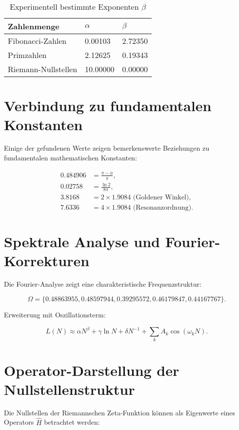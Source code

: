 \documentclass[a4paper,12pt]{article}
\begin{document}
\begin{table}[h]
    \centering
    \begin{tabular}{@{}lll@{}}
    \toprule
    Zahlenmenge       & $\alpha$  & $\beta$   \\ \midrule
    Fibonacci-Zahlen  & 0.00103   & 2.72350   \\
    Primzahlen        & 2.12625   & 0.19343   \\
    Riemann-Nullstellen & 10.00000 & 0.00000   \\ \bottomrule
    \end{tabular}
    \caption{Experimentell bestimmte Exponenten $\beta$}
\end{table}

\section{Verbindung zu fundamentalen Konstanten}
Einige der gefundenen Werte zeigen bemerkenswerte Beziehungen zu fundamentalen mathematischen Konstanten:

\begin{align}
0.484906 &= \frac{\pi - \phi}{\pi}, \\
0.02758 &= \frac{\ln 2}{8\pi}, \\
3.8168 &= 2 \times 1.9084 \text{ (Goldener Winkel)}, \\
7.6336 &= 4 \times 1.9084 \text{ (Resonanzordnung)}.
\end{align}

\section{Spektrale Analyse und Fourier-Korrekturen}
Die Fourier-Analyse zeigt eine charakteristische Frequenzstruktur:

\begin{equation}
\Omega = \{0.48863955, 0.48597944, 0.39295572, 0.46179847, 0.44167767\}.
\end{equation}

Erweiterung mit Oszillationsterm:

\begin{equation}
L(N) \approx \alpha N^\beta + \gamma \ln N + \delta N^{-1} + \sum_{k} A_k \cos(\omega_k N).
\end{equation}

\section{Operator-Darstellung der Nullstellenstruktur}
Die Nullstellen der Riemannschen Zeta-Funktion können als Eigenwerte eines Operators $\hat{H}$ betrachtet werden:
\end{document}
